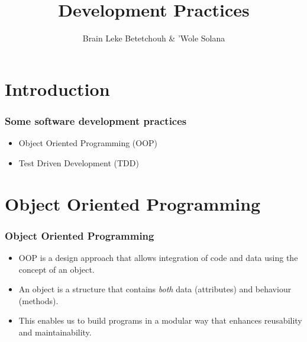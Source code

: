 \documentclass[10pt,t,xcolor=dvipsnames]{beamer}
\title{ Development Practices }
\author{ Brain Leke Betetchouh \& 'Wole Solana }
\begin{document}
\frame [c, plain]{\titlepage}
\section{Introduction}
\begin{frame}
\frametitle{Some software development practices}
\pause
\begin{itemize}[<+->]
\item Object Oriented Programming (OOP)
\item Test Driven Development (TDD)
\end{itemize}
\end{frame}
\section{Object Oriented Programming}
\begin{frame}[fragile]
\frametitle{Object Oriented Programming}
\pause
\begin{itemize}[<+->]
\item OOP is a design approach that allows integration of code and data using the concept of an \alert{object}.
\item An \alert{object} is a structure that contains \textit{both} data (attributes) and behaviour (methods).
\item This enables us to build programs in a modular way that enhances reusability and maintainability.
\end{itemize}
\end{frame}
\end{document}
